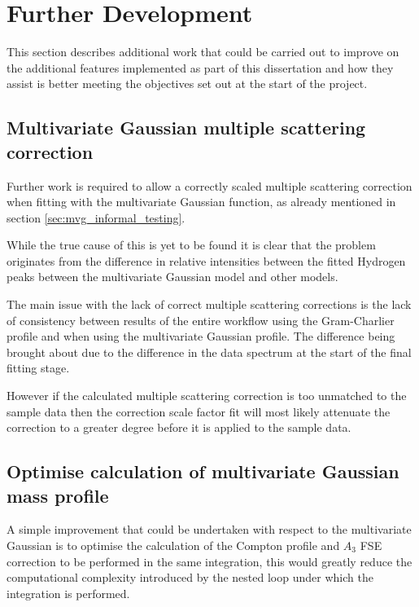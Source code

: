 \documentclass[a4paper]{article}
\begin{document}
\section{Further Development}
\label{sec:further_development}

This section describes additional work that could be carried out to improve on
the additional features implemented as part of this dissertation and how they
assist is better meeting the objectives set out at the start of the project.

\subsection{Multivariate Gaussian multiple scattering correction}

Further work is required to allow a correctly scaled multiple scattering
correction when fitting with the multivariate Gaussian function, as already
mentioned in section \ref{sec:mvg_informal_testing}.

While the true cause of this is yet to be found it is clear that the problem
originates from the difference in relative intensities between the fitted
Hydrogen peaks between the multivariate Gaussian model and other models.

The main issue with the lack of correct multiple scattering corrections is the
lack of consistency between results of the entire workflow using the
Gram-Charlier profile and when using the multivariate Gaussian profile. The
difference being brought about due to the difference in the data spectrum at the
start of the final fitting stage.

However if the calculated multiple scattering correction is too unmatched to the
sample data then the correction scale factor fit will most likely attenuate the
correction to a greater degree before it is applied to the sample data.

\subsection{Optimise calculation of multivariate Gaussian mass profile}

A simple improvement that could be undertaken with respect to the multivariate
Gaussian is to optimise the calculation of the Compton profile and $A_{3}$
\gls*{FSE} correction to be performed in the same integration, this would
greatly reduce the computational complexity introduced by the nested loop under
which the integration is performed.
\end{document}
